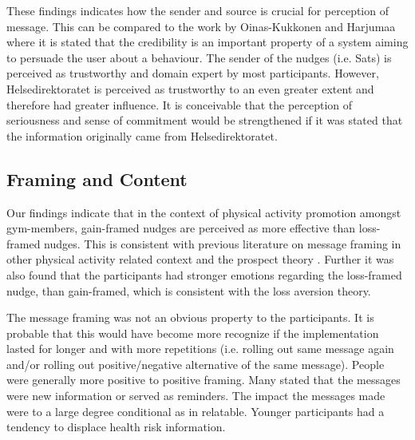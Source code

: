 These findings indicates how the sender and source is crucial for perception of message. This can be compared to the work by Oinas-Kukkonen and Harjumaa\cite{oinas-kukkonen_persuasive_2009}
where it is stated that the credibility is an important property of a system aiming to persuade the user about a behaviour. The sender of the nudges (i.e. Sats) is perceived as trustworthy and domain expert by most participants. However, Helsedirektoratet is perceived as trustworthy to an even greater extent and therefore had greater influence. It is conceivable that the perception of seriousness and sense of commitment would be strengthened if it was stated that the information originally came from Helsedirektoratet. 




\subsection{Framing and Content}
Our findings indicate that in the context of physical activity promotion amongst gym-members, gain-framed nudges are perceived as more effective than loss-framed nudges. This is consistent with previous literature on message framing in other physical activity related context and the prospect theory \cite{williams_effects_2019}.
Further it was also found that the participants had stronger emotions regarding the loss-framed nudge, than gain-framed, which is consistent with the loss aversion theory. 

The message framing was not an obvious property to the participants. It is probable that this would have become more recognize if the implementation lasted for longer and with more repetitions (i.e. rolling out same message again and/or rolling out positive/negative alternative of the same message). People were generally more positive to positive framing. Many stated that the messages were new information or served as reminders. The impact the messages made were to a large degree conditional as in relatable. Younger participants had a tendency to displace health risk information. 

